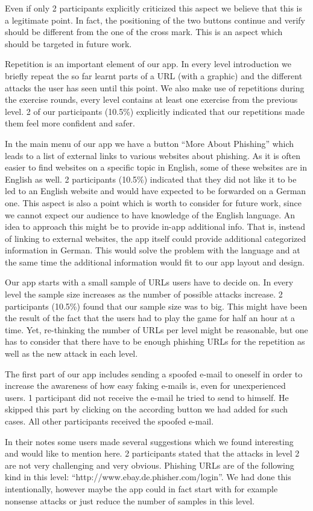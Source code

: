 \begin{description}[leftmargin=0cm]
Even if only 2 participants explicitly criticized this aspect we believe that this is a legitimate point.
In fact, the positioning of the two buttons continue and verify should be different from the one of the cross mark.
This is an aspect which should be targeted in future work. 
	\item[Repetition]
Repetition is an important element of our app.
In every level introduction we briefly repeat the so far learnt parts of a URL (with a graphic) and the different attacks the user has seen until this point.
We also make use of repetitions during the exercise rounds, every level contains at least one exercise from the previous level.
2 of our participants (10.5\%) explicitly indicated that our repetitions made them feel more confident and safer.
	\item[External Links]
In the main menu of our app we have a button ``More About Phishing'' which leads to a list of external links to various websites about phishing.
As it is often easier to find websites on a specific topic in English, some of these websites are in English as well.
2 participants (10.5\%) indicated that they did not like it to be led to an English website and would have expected to be forwarded on a German one.
This aspect is also a point which is worth to consider for future work, since we cannot expect our audience to have knowledge of the English language.
An idea to approach this might be to provide in-app additional info.
That is, instead of linking to external websites, the app itself could provide additional categorized information in German.
This would solve the problem with the language and at the same time the additional information would fit to our app layout and design.
	\item[Amount of Examples] Our app starts with a small sample of URLs users have to decide on.
In every level the sample size increases as the number of possible attacks increase.
2 participants (10.5\%) found that our sample size was to big.
This might have been the result of the fact that the users had to play the game for half an hour at a time.
Yet, re-thinking the number of URLs per level might be reasonable, but one has to consider that there have to be enough phishing URLs for the repetition as well as the new attack in each level.
	\item[Mail Not Received] The first part of our app includes sending a spoofed e-mail to oneself in order to increase the awareness of how easy faking e-mails is, even for unexperienced users.
1 participant did not receive the e-mail he tried to send to himself.
He skipped this part by clicking on the according button we had added for such cases.
All other participants received the spoofed e-mail.
	\item[Further Suggestions] In their notes some users made several suggestions which we found interesting and would like to mention here.
2 participants stated that the attacks in level 2 are not very challenging and very obvious.
Phishing URLs are of the following kind in this level: ``http://www.ebay.de.phisher.com/login''.
We had done this intentionally, however maybe the app could in fact start with for example nonsense attacks or just reduce the number of samples in this level.


\end{description}
